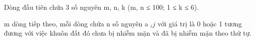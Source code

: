 Dòng đầu tiên chứa 3 số nguyên m, n, k (m, n ≤ 100; 1 ≤ k ≤ 6).  

   m dòng tiếp theo, mỗi dòng chứa n số nguyên a   $_    ij   $   với giá trị là 0 hoặc 1 tương đương với việc khuôn đất đó chưa bị nhiễm mặn và đã bị nhiễm mặn theo thứ tự.  

\